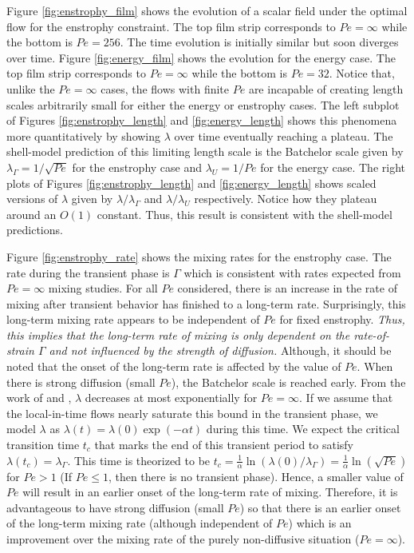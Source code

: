 \documentclass[12pt]{iopart}
\begin{document}
 Figure \ref{fig:enstrophy_film} shows the evolution of a scalar field under the optimal flow for the enstrophy constraint. The top film strip corresponds to $Pe =\infty$ while the bottom is $Pe = 256$. The time evolution is initially similar but soon diverges over time. Figure \ref{fig:energy_film} shows the evolution for the energy case. The top film strip corresponds to $Pe =\infty$ while the bottom is $Pe = 32$. Notice that, unlike the $Pe = \infty$ cases, the flows with finite $Pe$ are incapable of creating length scales arbitrarily small for either the energy or enstrophy cases.  The left subplot of Figures \ref{fig:enstrophy_length} and \ref{fig:energy_length} shows this phenomena more quantitatively by showing $\lambda$ over time eventually reaching a plateau. The shell-model prediction of this limiting length scale is the Batchelor scale given by $\lambda_{\Gamma} = 1/\sqrt{Pe}$ for the enstrophy case and  $\lambda_{U} = 1/Pe$ for the energy case. The right plots of Figures \ref{fig:enstrophy_length} and \ref{fig:energy_length} shows scaled versions of $\lambda$ given by  $\lambda/\lambda_{\Gamma}$ and $\lambda/\lambda_{U}$ respectively.  Notice how they plateau around an $O(1)$ constant. Thus, this result is consistent with the shell-model predictions. 
   
Figure \ref{fig:enstrophy_rate} shows the mixing rates for the enstrophy case. The rate during the transient phase is $\Gamma$ which is consistent with rates expected from $Pe=\infty$ mixing studies. For all $Pe$ considered, there is an increase in the rate of mixing after transient behavior has finished to a long-term rate. Surprisingly, this long-term mixing rate appears to be independent of $Pe$ for fixed enstrophy. {\it Thus, this implies that the long-term rate of mixing is only dependent on the rate-of-strain $\Gamma$ and not influenced by the strength of diffusion. }Although, it should be noted that the onset of the long-term rate is affected by the value of $Pe$. When there is strong diffusion (small $Pe$), the Batchelor scale is reached early. From the work of \cite{GI2014} and \cite{CS2013}, $\lambda$ decreases at most exponentially for $Pe = \infty$. If we assume that the local-in-time flows nearly saturate this bound in the transient phase, we model $\lambda$ as  $\lambda (t) = \lambda(0)\exp(- \alpha t) $ during this time. We expect the critical transition time $t_{c}$ that marks the end of this transient period to satisfy $\lambda(t_{c})= \lambda_{\Gamma}$. This time is theorized to be $t_{c}=\frac{1}{\alpha}\ln(\lambda(0)/\lambda_{\Gamma}) = \frac{1}{\alpha}\ln ( \sqrt{Pe} )$ for $Pe>1$ (If $Pe \leq 1$, then there is no transient phase). Hence, a smaller value of $Pe$ will result in an earlier onset of the long-term rate of mixing. Therefore, it is advantageous to have strong diffusion (small $Pe$) so that there is an earlier onset of the long-term mixing rate (although independent of $Pe$) which is an improvement over the mixing rate of the purely non-diffusive situation ($Pe=\infty$).
 
\end{document}
